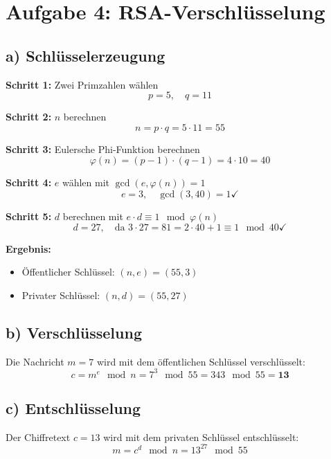 \documentclass[
	fontsize=12pt,
	paper=a4,
	numbers=noenddot,
	listof=totoc,
	listof=entryprefix,
	listof=nochaptergap,
	bibliography=totoc,
	parskip=half,
	openany
]{scrbook}
\begin{document}
\chapter*{Aufgabe 4: RSA-Verschlüsselung}

\section*{a) Schlüsselerzeugung}

\textbf{Schritt 1:} Zwei Primzahlen wählen
\[ p = 5, \quad q = 11 \]

\textbf{Schritt 2:} $n$ berechnen
\[ n = p \cdot q = 5 \cdot 11 = 55 \]

\textbf{Schritt 3:} Eulersche Phi-Funktion berechnen
\[ \varphi(n) = (p-1) \cdot (q-1) = 4 \cdot 10 = 40 \]

\textbf{Schritt 4:} $e$ wählen mit $\gcd(e, \varphi(n)) = 1$
\[ e = 3, \quad \gcd(3, 40) = 1 \checkmark \]

\textbf{Schritt 5:} $d$ berechnen mit $e \cdot d \equiv 1 \mod \varphi(n)$
\[ d = 27, \quad \text{da } 3 \cdot 27 = 81 = 2 \cdot 40 + 1 \equiv 1 \mod 40 \checkmark \]

\textbf{Ergebnis:}
\begin{itemize}
	\item Öffentlicher Schlüssel: $(n, e) = (55, 3)$
	\item Privater Schlüssel: $(n, d) = (55, 27)$
\end{itemize}

\section*{b) Verschlüsselung}

Die Nachricht $m = 7$ wird mit dem öffentlichen Schlüssel verschlüsselt:
\[ c = m^e \mod n = 7^3 \mod 55 = 343 \mod 55 = \mathbf{13} \]

\section*{c) Entschlüsselung}

Der Chiffretext $c = 13$ wird mit dem privaten Schlüssel entschlüsselt:
\[ m = c^d \mod n = 13^{27} \mod 55 \]
\end{document}
